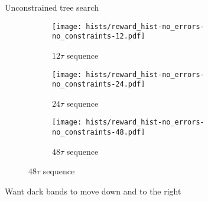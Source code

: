\documentclass{beamer}
\begin{document}
\begin{frame}{Unconstrained tree search}
%

\begin{figure}[H]
    \centering
    \begin{subfigure}{.49\textwidth}
        \centering
        \texttt{[image: hists/reward\_hist-no\_errors-no\_constraints-12.pdf]}
        \caption{$12\tau$ sequence}
        \label{fig:reward_hist-no_errors-no_constraints-12}
    \end{subfigure}
    \begin{subfigure}{.49\textwidth}
        \centering
        \texttt{[image: hists/reward\_hist-no\_errors-no\_constraints-24.pdf]}
        \caption{$24\tau$ sequence}
        \label{fig:reward_hist-no_errors-no_constraints-24}
    \end{subfigure}
    \begin{subfigure}{.49\textwidth}
        \centering
        \texttt{[image: hists/reward\_hist-no\_errors-no\_constraints-48.pdf]}
        \caption{$48\tau$ sequence}
        \label{fig:reward_hist-no_errors-no_constraints-48}
    \end{subfigure}
\end{figure}

Want dark bands to move down and to the right


\end{frame}
\end{document}
